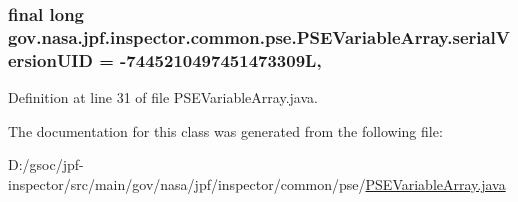 \subsubsection[{\texorpdfstring{serial\+Version\+U\+ID}{serialVersionUID}}]{\setlength{\rightskip}{0pt plus 5cm}final long gov.\+nasa.\+jpf.\+inspector.\+common.\+pse.\+P\+S\+E\+Variable\+Array.\+serial\+Version\+U\+ID = -\/7445210497451473309L\hspace{0.3cm}{\ttfamily [static]}, {\ttfamily [private]}}\hypertarget{classgov_1_1nasa_1_1jpf_1_1inspector_1_1common_1_1pse_1_1_p_s_e_variable_array_ace1c233664c5489a4f5085068a75c0ed}{}\label{classgov_1_1nasa_1_1jpf_1_1inspector_1_1common_1_1pse_1_1_p_s_e_variable_array_ace1c233664c5489a4f5085068a75c0ed}


Definition at line 31 of file P\+S\+E\+Variable\+Array.\+java.



The documentation for this class was generated from the following file\+:\begin{DoxyCompactItemize}
\item 
D\+:/gsoc/jpf-\/inspector/src/main/gov/nasa/jpf/inspector/common/pse/\hyperlink{_p_s_e_variable_array_8java}{P\+S\+E\+Variable\+Array.\+java}\end{DoxyCompactItemize}
